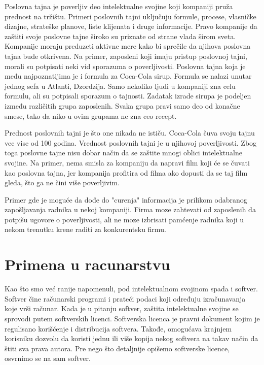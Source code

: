 \documentclass[a4paper]{article}
\begin{document}
Poslovna tajna je poverljiv deo intelektualne svojine koji kompaniji pruža prednost na tržištu. Primeri poslovnih tajni uključuju formule, procese, vlasničke dizajne, strateške planove, liste klijenata i druge informacije. Pravo kompanije da zaštiti svoje poslovne tajne široko su priznate od strane vlada širom sveta. Kompanije moraju preduzeti aktivne mere kako bi sprečile da njihova poslovna tajna bude otkrivena. Na primer, zaposleni koji imaju pristup poslovnoj tajni, morali su potpisati neki vid sporazuma o poverljivosti. Poslovna tajna koja je među najpoznatijima je i formula za Coca-Cola sirup. Formula se nalazi unutar jednog sefa u Atlanti, Dzordzija. Samo nekoliko ljudi u kompaniji zna celu formulu, ali su potpisali sporazum o tajnosti. Zadatak izrade sirupa je podeljen između različitih grupa zaposlenih. Svaka grupa pravi samo deo od konačne smese, tako da niko u ovim grupama ne zna ceo recept.

Prednost poslovnih tajni je što one nikada ne ističu. Coca-Cola čuva svoju tajnu vec vise od 100 godina.
Vrednost poslovnih tajni je u njihovoj poverljivosti. Zbog toga poslovne tajne nisu dobar način da se zaštite mnogi oblici intelektualne svojine. Na primer, nema smisla za kompaniju da napravi film koji će se čuvati kao poslovna tajna, jer kompanija profitira od filma ako dopusti da se taj film gleda, što ga ne čini više poverljivim.

Primer gde je moguće da dođe do "curenja" informacija je prilikom odabranog zapošljavanja radnika u nekoj kompaniji. Firma moze zahtevati od zaposlenih da potpišu ugovore o poverljivosti, ali ne moze izbrisati pamćenje radnika koji u nekom trenutku krene raditi za konkurentsku firmu.

\section{Primena u racunarstvu}
\label{primena_u_racuarstvu}

Kao što smo već ranije napomenuli, pod intelektualnom svojinom spada i softver.
Softver čine računarski programi i prateći podaci koji određuju izračunavanja koje vrši
računar. \cite{p1} Kada je u pitanju softver, zaštita intelektualne svojine se sprovodi putem
softverskih licenci.
Softverska licenca je pravni dokument kojim je regulisano korišćenje i
distribucija softvera. Takođe, omogućava krajnjem korisniku dozvolu da koristi jednu ili
više kopija nekog softvera na takav način da štiti sva prava autora. Pre nego što detaljnije
opišemo softverske licence, osvrnimo se na sam softver.
\end{document}
